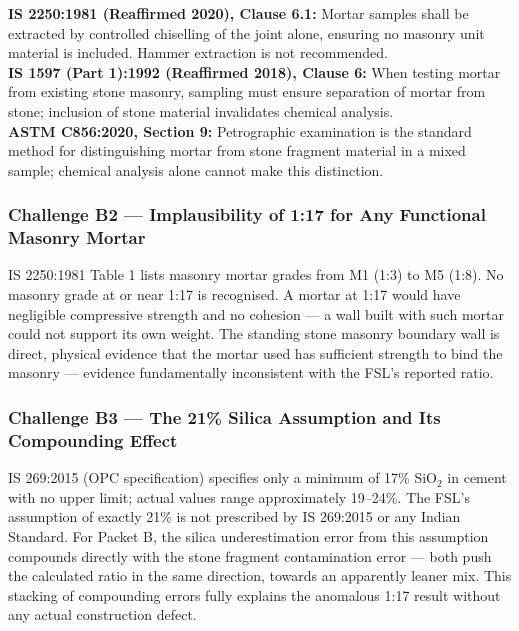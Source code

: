 \documentclass[12pt, a4paper]{article}
\begin{document}
\begin{standardbox}
\textbf{IS 2250:1981 (Reaffirmed 2020), Clause 6.1:} Mortar samples shall be extracted by controlled chiselling of the joint alone, ensuring no masonry unit material is included. Hammer extraction is not recommended.\\
\textbf{IS 1597 (Part 1):1992 (Reaffirmed 2018), Clause 6:} When testing mortar from existing stone masonry, sampling must ensure separation of mortar from stone; inclusion of stone material invalidates chemical analysis.\\
\textbf{ASTM C856:2020, Section 9:} Petrographic examination is the standard method for distinguishing mortar from stone fragment material in a mixed sample; chemical analysis alone cannot make this distinction.
\end{standardbox}

\subsubsection{Challenge B2 --- Implausibility of 1:17 for Any Functional Masonry Mortar}

IS 2250:1981 Table 1 lists masonry mortar grades from M1 (1:3) to M5 (1:8). No masonry grade at or near 1:17 is recognised. A mortar at 1:17 would have negligible compressive strength and no cohesion --- a wall built with such mortar could not support its own weight. The standing stone masonry boundary wall is direct, physical evidence that the mortar used has sufficient strength to bind the masonry --- evidence fundamentally inconsistent with the FSL's reported ratio.

\subsubsection{Challenge B3 --- The 21\% Silica Assumption and Its Compounding Effect}

IS 269:2015 (OPC specification) specifies only a minimum of 17\% SiO$_2$ in cement with no upper limit; actual values range approximately 19--24\%. The FSL's assumption of exactly 21\% is not prescribed by IS 269:2015 or any Indian Standard. For Packet B, the silica underestimation error from this assumption compounds directly with the stone fragment contamination error --- both push the calculated ratio in the same direction, towards an apparently leaner mix. This stacking of compounding errors fully explains the anomalous 1:17 result without any actual construction defect.
\end{document}
